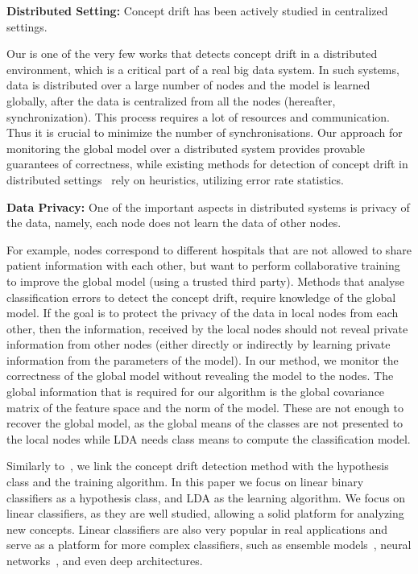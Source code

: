 \documentclass{sig-alternate-05-2015}
\begin{document}
\noindent \textbf{Distributed Setting:} Concept drift has been actively studied in centralized settings.

    Our is one of the very few works \cite{AngGZPH13} that detects concept drift in a distributed
    environment, which is a critical part of a real big data system.
    In such systems, data is distributed over a large number of nodes and the model is learned
    globally, after the data is centralized from all the nodes (hereafter, synchronization).
    This process requires a lot of resources and communication.
    Thus it is crucial to minimize the number of synchronisations.
    Our approach for monitoring the global model over a distributed system
    provides provable guarantees of correctness, while existing methods for detection of concept
    drift in distributed settings~\cite{AngGZPH13} rely on heuristics, utilizing error rate statistics.

\noindent \textbf{Data Privacy:} One of the important aspects in distributed systems is privacy of the data,    namely, each node does not learn the data of other nodes.


    For example, nodes correspond to different hospitals that are not allowed
    to share patient information with each other, but want to perform
    collaborative training to improve the global model (using a trusted third party).
    Methods that analyse classification errors to detect the concept drift,
    require knowledge of the global model. If the goal is to protect the
    privacy of the data in local nodes from each other, then the information,
    received by the local nodes should not reveal private information from other
    nodes (either directly or indirectly by learning private information from the
    parameters of the model).
    In our method, we monitor the correctness of the global model without
    revealing the model to the nodes. The global information that is required
    for our algorithm is the global covariance matrix of the feature space
    and the norm of the model. These are not enough to recover the global model,
    as the global means of the classes are not presented to the local nodes
    while LDA needs class means to compute the classification model.



Similarly to~\cite{icml2014c2_harel14}, we link the concept drift detection method with the
hypothesis class and the training algorithm.
In this paper we focus on linear binary classifiers as a hypothesis class, and
LDA \cite{fisher1936use} as the learning algorithm.
We focus on linear classifiers, as they are well studied, allowing a solid platform for analyzing new concepts. Linear classifiers are also very popular in real applications and serve as a platform for more complex classifiers, such as ensemble models~\cite{Deva, eSVM},
neural networks~\cite{osadchy2015k}, and even deep architectures\cite{ROSS}.
\end{document}
